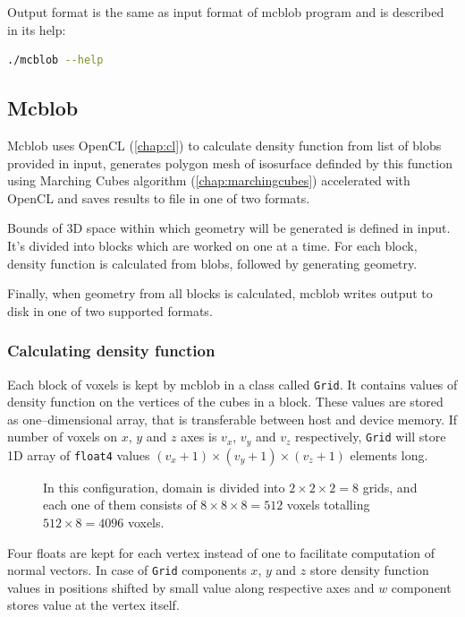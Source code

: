 Output format is the same as input format of mcblob program and is described in
its help:
\begin{lstlisting}[language=bash,numbers=none]
./mcblob --help
\end{lstlisting}

\subsection{Mcblob}

Mcblob uses OpenCL (\autoref{chap:cl}) to calculate density function from
list of blobs provided in input, generates polygon mesh of isosurface
definded by this function using Marching Cubes algorithm (\autoref{chap:marchingcubes})
accelerated with OpenCL and saves results to file in one of two formats.

Bounds of 3D space within which geometry will be generated is defined in input.
It's divided into blocks which are worked on one at a time. For each block,
density function is calculated from blobs, followed by generating geometry.

Finally, when geometry from all blocks is calculated, mcblob writes output to
disk in one of two supported formats.

\subsubsection{Calculating density function}

Each block of voxels is kept by mcblob in a class called \texttt{Grid}. It
contains values of density function on the vertices of the cubes in a block.
These values are stored as one--dimensional array, that is transferable between host and
device memory. If number of voxels on $x$, $y$ and $z$ axes is $v_x$, $v_y$
and $v_z$ respectively, \texttt{Grid} will store 1D array
of \texttt{float4} values $(v_x+1)\times(v_y+1)\times(v_z+1)$ elements long.

\begin{figure}[tb]
  \begin{center}
    
  \end{center}
  \caption{In this configuration, domain is divided into $2\times2\times2=8$
  grids, and each one of them consists of $8\times8\times8=512$ voxels totalling
 $512\times8=4096$ voxels.}
  \label{fig:grid}
\end{figure}

Four floats are kept for each vertex instead of one to facilitate computation of
normal vectors. In case of \texttt{Grid} components $x$, $y$ and
$z$ store density function values in positions shifted by small value along
respective axes and $w$ component stores value at the vertex itself.

